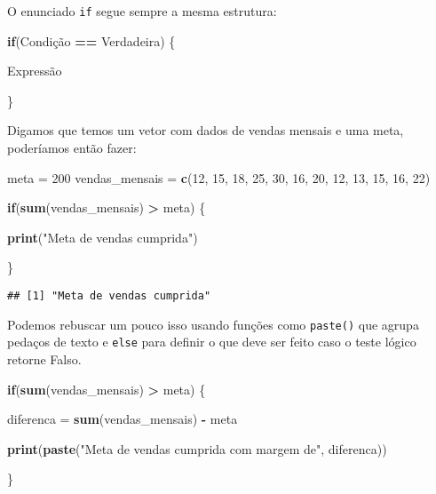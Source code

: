 \documentclass[]{article}
\newenvironment{Shaded}{\begin{snugshade}}{\end{snugshade}}
\newcommand{\ControlFlowTok}[1]{\textcolor[rgb]{0.13,0.29,0.53}{\textbf{#1}}}
\newcommand{\DecValTok}[1]{\textcolor[rgb]{0.00,0.00,0.81}{#1}}
\newcommand{\KeywordTok}[1]{\textcolor[rgb]{0.13,0.29,0.53}{\textbf{#1}}}
\newcommand{\NormalTok}[1]{#1}
\newcommand{\OperatorTok}[1]{\textcolor[rgb]{0.81,0.36,0.00}{\textbf{#1}}}
\newcommand{\StringTok}[1]{\textcolor[rgb]{0.31,0.60,0.02}{#1}}
\begin{document}
O enunciado \texttt{if} segue sempre a mesma estrutura:

\begin{Shaded}
\begin{Highlighting}[]
\ControlFlowTok{if}\NormalTok{(Condição }\OperatorTok{==}\StringTok{ }\NormalTok{Verdadeira) \{}
  
\NormalTok{  Expressão}
  
\NormalTok{  \}}
\end{Highlighting}
\end{Shaded}

Digamos que temos um vetor com dados de vendas mensais e uma meta,
poderíamos então fazer:

\begin{Shaded}
\begin{Highlighting}[]
\NormalTok{meta =}\StringTok{ }\DecValTok{200}
\NormalTok{vendas_mensais =}\StringTok{ }\KeywordTok{c}\NormalTok{(}\DecValTok{12}\NormalTok{, }\DecValTok{15}\NormalTok{, }\DecValTok{18}\NormalTok{, }\DecValTok{25}\NormalTok{, }\DecValTok{30}\NormalTok{, }\DecValTok{16}\NormalTok{, }\DecValTok{20}\NormalTok{, }\DecValTok{12}\NormalTok{, }\DecValTok{13}\NormalTok{, }\DecValTok{15}\NormalTok{, }\DecValTok{16}\NormalTok{, }\DecValTok{22}\NormalTok{)}

\ControlFlowTok{if}\NormalTok{(}\KeywordTok{sum}\NormalTok{(vendas_mensais) }\OperatorTok{>}\StringTok{ }\NormalTok{meta) \{}
  
  \KeywordTok{print}\NormalTok{(}\StringTok{"Meta de vendas cumprida"}\NormalTok{)}

\NormalTok{  \}}
\end{Highlighting}
\end{Shaded}

\begin{verbatim}
## [1] "Meta de vendas cumprida"
\end{verbatim}

Podemos rebuscar um pouco isso usando funções como \texttt{paste()} que
agrupa pedaços de texto e \texttt{else} para definir o que deve ser
feito caso o teste lógico retorne Falso.

\begin{Shaded}
\begin{Highlighting}[]
\ControlFlowTok{if}\NormalTok{(}\KeywordTok{sum}\NormalTok{(vendas_mensais) }\OperatorTok{>}\StringTok{ }\NormalTok{meta) \{}
  
\NormalTok{  diferenca =}\StringTok{ }\KeywordTok{sum}\NormalTok{(vendas_mensais) }\OperatorTok{-}\StringTok{ }\NormalTok{meta}
  
  \KeywordTok{print}\NormalTok{(}\KeywordTok{paste}\NormalTok{(}\StringTok{"Meta de vendas cumprida com margem de"}\NormalTok{, diferenca))}

\NormalTok{  \} }
\end{Highlighting}
\end{Shaded}
\end{document}
